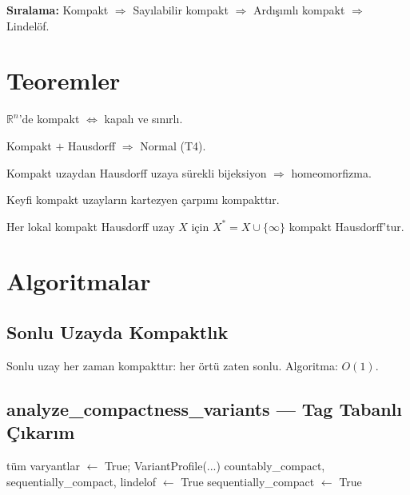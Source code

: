 \textbf{Sıralama:} Kompakt $\Rightarrow$ Sayılabilir kompakt $\Rightarrow$ Ardışımlı kompakt $\Rightarrow$ Lindelöf.

\section{Teoremler}

\begin{theorem}
$\mathbb{R}^n$'de kompakt $\Leftrightarrow$ kapalı ve sınırlı.
\end{theorem}

\begin{theorem}
Kompakt $+$ Hausdorff $\Rightarrow$ Normal (T4).
\end{theorem}

\begin{theorem}
Kompakt uzaydan Hausdorff uzaya sürekli bijeksiyon $\Rightarrow$ homeomorfizma.
\end{theorem}

\begin{theorem}[Tychonoff]
Keyfi kompakt uzayların kartezyen çarpımı kompakttır.
\end{theorem}

\begin{theorem}
Her lokal kompakt Hausdorff uzay $X$ için $X^* = X \cup \{\infty\}$ kompakt Hausdorff'tur.
\end{theorem}

\section{Algoritmalar}

\subsection{Sonlu Uzayda Kompaktlık}

Sonlu uzay her zaman kompakttır: her örtü zaten sonlu.
Algoritma: $O(1)$.

\subsection{analyze\_compactness\_variants — Tag Tabanlı Çıkarım}

\begin{algorithm}
\caption{AnalyzeVariants$(X, \tau)$}
\begin{algorithmic}[1]
    \State tüm varyantlar $\leftarrow$ True; \Return VariantProfile(...)
\EndIf
{}
    \State countably\_compact, sequentially\_compact, lindelof $\leftarrow$ True
\EndIf
{}
    \State sequentially\_compact $\leftarrow$ True
\EndIf
\end{algorithmic}
\end{algorithm}

